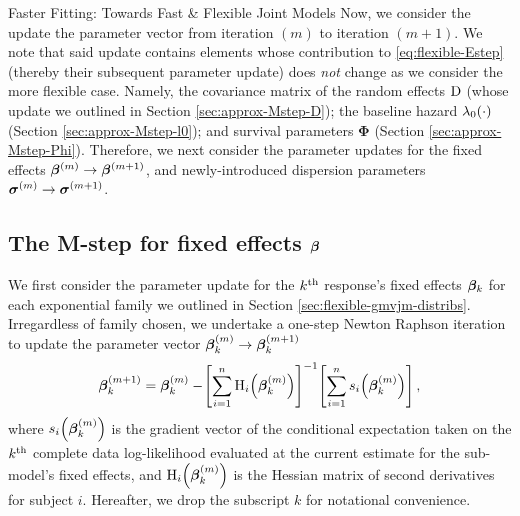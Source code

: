 \begin{chapter}{\label{cha:flexible}Faster Fitting: Towards Fast \& Flexible Joint Models}
Now, we consider the update the parameter vector from iteration $(m)$ to iteration $(m+1)$. We note that said update contains elements whose contribution to \eqref{eq:flexible-Estep} (thereby their subsequent parameter update) does \textit{not} change as we consider the more flexible case. Namely, the covariance matrix of the random effects $\mathrm{D}$ (whose update we outlined in Section \ref{sec:approx-Mstep-D}); the baseline hazard $\lambda_0\!\left(\cdot\right)$ (Section \ref{sec:approx-Mstep-l0}); and survival parameters $\bm{\Phi}$ (Section \ref{sec:approx-Mstep-Phi}). Therefore, we next consider the parameter updates for the fixed effects $\bm{\beta}^{(m)}\rightarrow\bm{\beta}^{(m+1)}$, and newly-introduced dispersion parameters $\bm{\sigma}^{(m)}\rightarrow\bm{\sigma}^{(m+1)}$.

\subsection{The M-step for fixed effects \texorpdfstring{$\bm{\beta}$}{beta}}\label{sec:flexible-Mstep-fixef}
\rmtoc
We first consider the parameter update for the $k^{\text{th}}$ response's fixed effects $\bm{\beta}_k$ for each exponential family we outlined in Section \ref{sec:flexible-gmvjm-distribs}. Irregardless of family chosen, we undertake a one-step Newton Raphson iteration to update the parameter vector $\bm{\beta}_k^{(m)}\rightarrow\bm{\beta}_k^{(m+1)}$ 
\begin{equation}
    \bm{\beta}_k^{(m+1)}=\bm{\beta}_k^{(m)}-\!\left[\sum_{i=1}^n\mathrm{H}_i\!\left(\bm{\beta}_k^{(m)}\right)\right]^{-1}\!\left[\sum_{i=1}^n s_i\!\left(\bm{\beta}_k^{(m)}\right)\right],
\label{eq:flexible-NRstep-beta}
\end{equation}
where $s_i\!\left(\bm{\beta}_k^{(m)}\right)$ is the gradient vector of the conditional expectation taken on the $k^{\text{th}}$ complete data log-likelihood evaluated at the current estimate for the sub-model's fixed effects, and $\mathrm{H}_i\!\left(\bm{\beta}_k^{(m)}\right)$ is the Hessian matrix of second derivatives for subject $i$. Hereafter, we drop the subscript $k$ for notational convenience.


\end{chapter}
